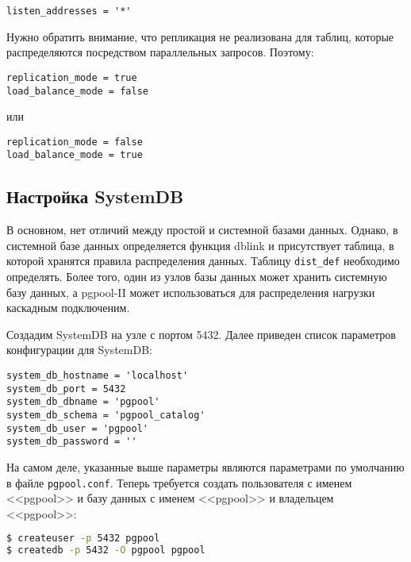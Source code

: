 \begin{lstlisting}[label=lst:pgpool23,caption=Настройка параллельного запроса]
listen_addresses = '*'
\end{lstlisting}

Нужно обратить внимание, что репликация не реализована для таблиц, которые распределяются посредством параллельных запросов. Поэтому:

\begin{lstlisting}[label=lst:pgpool24,caption=Настройка параллельного запроса]
replication_mode = true
load_balance_mode = false
\end{lstlisting}

или

\begin{lstlisting}[label=lst:pgpool25,caption=Настройка параллельного запроса]
replication_mode = false
load_balance_mode = true
\end{lstlisting}

\subsection{Настройка SystemDB}

В основном, нет отличий между простой и системной базами данных. Однако, в системной базе данных определяется функция dblink и присутствует таблица, в которой хранятся правила распределения данных. Таблицу \lstinline!dist_def! необходимо определять. Более того, один из узлов базы данных может хранить системную базу данных, а pgpool-II может использоваться для распределения нагрузки каскадным подключеним.

Создадим SystemDB на узле с портом 5432. Далее приведен список параметров конфигурации для SystemDB:

\begin{lstlisting}[label=lst:pgpool26,caption=Настройка SystemDB]
system_db_hostname = 'localhost'
system_db_port = 5432
system_db_dbname = 'pgpool'
system_db_schema = 'pgpool_catalog'
system_db_user = 'pgpool'
system_db_password = ''
\end{lstlisting}

На самом деле, указанные выше параметры являются параметрами по умолчанию в файле \lstinline!pgpool.conf!. Теперь требуется создать пользователя с именем <<pgpool>> и базу данных с именем <<pgpool>> и владельцем <<pgpool>>:

\begin{lstlisting}[language=Bash,label=lst:pgpool27,caption=Настройка SystemDB]
$ createuser -p 5432 pgpool
$ createdb -p 5432 -O pgpool pgpool
\end{lstlisting}


